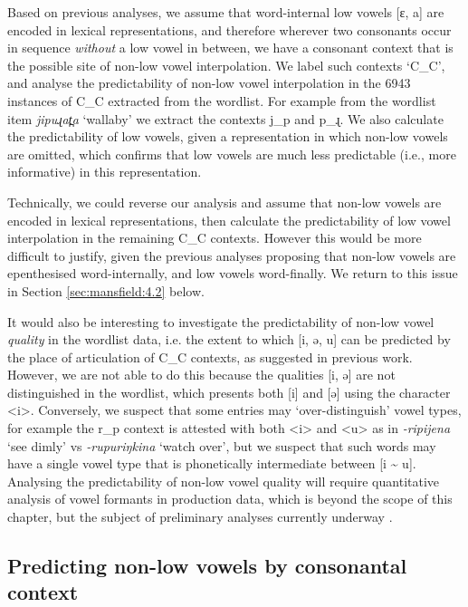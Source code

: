 \documentclass[output=paper,colorlinks,citecolor=brown]{langscibook}
\begin{document}
Based on previous analyses, we assume that word-internal low vowels [ɛ, a] are encoded in lexical representations, and therefore wherever two consonants occur in sequence \textit{without} a low vowel in between, we have a consonant context that is the possible site of non-low vowel interpolation. We label such contexts ‘\textsc{C\_C}’, and analyse the predictability of non-low vowel interpolation in the 6943 instances of \textsc{C\_C} extracted from the wordlist. For example from the wordlist item \textit{jipuɻat̪a} ‘wallaby’ we extract the contexts j\_p and p\_ɻ. We also calculate the predictability of low vowels, given a representation in which non-low vowels are omitted, which confirms that low vowels are much less predictable (i.e., more informative) in this representation.

Technically, we could reverse our analysis and assume that non-low vowels are encoded in lexical representations, then calculate the predictability of low vowel interpolation in the remaining C\_C contexts. However this would be more difficult to justify, given the previous analyses proposing that non-low vowels are epenthesised word-internally, and low vowels word-finally. We return to this issue in Section \ref{sec:mansfield:4.2} below.

It would also be interesting to investigate the predictability of non-low vowel \textit{quality} in the wordlist data, i.e. the extent to which [i, ə, u] can be predicted by the place of articulation of \textsc{C\_C} contexts, as suggested in previous work. However, we are not able to do this because the qualities [i, ə] are not distinguished in the wordlist, which presents both [i] and [ə] using the character <i>. Conversely, we suspect that some entries may ‘over-distinguish’ vowel types, for example the r\_p context is attested with both <i> and <u> as in \textit{\nobreakdash-ripijena} ‘see dimly’ vs \textit{\nobreakdash-rupuriŋkina} ‘watch over’, but we suspect that such words may have a single vowel type that is phonetically intermediate between [i {\textasciitilde} u]. Analysing the predictability of non-low vowel quality will require quantitative analysis of vowel formants in production data, which is beyond the scope of this chapter, but the subject of preliminary analyses currently underway \citep{billington_acoustic_nodate}. 

\subsection{Predicting non-low vowels by consonantal context}\label{sec:mansfield:4.1}
\end{document}
